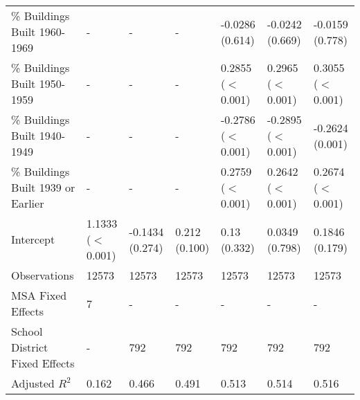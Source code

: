 \begin{table}[h]
\begin{tabular}{l|llllll}
\% Buildings Built 1960-1969 &- & - & - & -0.0286 (0.614) & -0.0242 (0.669) & -0.0159 (0.778) \\
\% Buildings Built 1950-1959 &- & - & - & 0.2855 ($<$0.001) & 0.2965 ($<$0.001) & 0.3055 ($<$0.001) \\
\% Buildings Built 1940-1949 &- & - & - & -0.2786 ($<$0.001) & -0.2895 ($<$0.001) & -0.2624 (0.001) \\
\% Buildings Built 1939 or Earlier &- & - & - & 0.2759 ($<$0.001) & 0.2642 ($<$0.001) & 0.2674 ($<$0.001) \\
Intercept &1.1333 ($<$0.001) & -0.1434 (0.274) & 0.212 (0.100) & 0.13 (0.332) & 0.0349 (0.798) & 0.1846 (0.179) \\
Observations &12573 & 12573 & 12573 & 12573 & 12573 & 12573 \\
MSA Fixed Effects &7 & - & - & - & - & - \\
School District Fixed Effects &- & 792 & 792 & 792 & 792 & 792 \\
Adjusted $R^2$ &0.162 & 0.466 & 0.491 & 0.513 & 0.514 & 0.516 \\\hline
\end{tabular}
\end{table}
